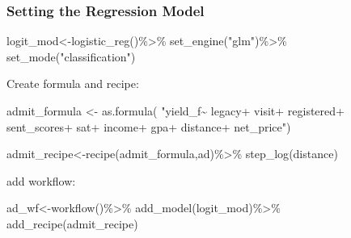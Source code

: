 \documentclass[
]{article}
\newenvironment{Shaded}{\begin{snugshade}}{\end{snugshade}}
\newcommand{\FunctionTok}[1]{\textcolor[rgb]{0.00,0.00,0.00}{#1}}
\newcommand{\NormalTok}[1]{#1}
\newcommand{\OtherTok}[1]{\textcolor[rgb]{0.56,0.35,0.01}{#1}}
\newcommand{\SpecialCharTok}[1]{\textcolor[rgb]{0.00,0.00,0.00}{#1}}
\newcommand{\StringTok}[1]{\textcolor[rgb]{0.31,0.60,0.02}{#1}}
\begin{document}
\hypertarget{setting-the-regression-model}{%
\subsubsection{Setting the Regression
Model}\label{setting-the-regression-model}}

\begin{Shaded}
\begin{Highlighting}[]
\NormalTok{logit\_mod}\OtherTok{\textless{}{-}}\FunctionTok{logistic\_reg}\NormalTok{()}\SpecialCharTok{\%\textgreater{}\%}
  \FunctionTok{set\_engine}\NormalTok{(}\StringTok{"glm"}\NormalTok{)}\SpecialCharTok{\%\textgreater{}\%}
  \FunctionTok{set\_mode}\NormalTok{(}\StringTok{"classification"}\NormalTok{)}
\end{Highlighting}
\end{Shaded}

Create formula and recipe:

\begin{Shaded}
\begin{Highlighting}[]
\NormalTok{admit\_formula }\OtherTok{\textless{}{-}} \FunctionTok{as.formula}\NormalTok{(}
                  \StringTok{"yield\_f\textasciitilde{}}
\StringTok{                          legacy+}
\StringTok{                          visit+}
\StringTok{                          registered+}
\StringTok{                          sent\_scores+}
\StringTok{                          sat+}
\StringTok{                          income+}
\StringTok{                          gpa+}
\StringTok{                          distance+}
\StringTok{                          net\_price"}\NormalTok{)}

\NormalTok{admit\_recipe}\OtherTok{\textless{}{-}}\FunctionTok{recipe}\NormalTok{(admit\_formula,ad)}\SpecialCharTok{\%\textgreater{}\%}
  \FunctionTok{step\_log}\NormalTok{(distance)}
\end{Highlighting}
\end{Shaded}

add workflow:

\begin{Shaded}
\begin{Highlighting}[]
\NormalTok{ad\_wf}\OtherTok{\textless{}{-}}\FunctionTok{workflow}\NormalTok{()}\SpecialCharTok{\%\textgreater{}\%}
  \FunctionTok{add\_model}\NormalTok{(logit\_mod)}\SpecialCharTok{\%\textgreater{}\%}
  \FunctionTok{add\_recipe}\NormalTok{(admit\_recipe)}
\end{Highlighting}
\end{Shaded}
\end{document}
